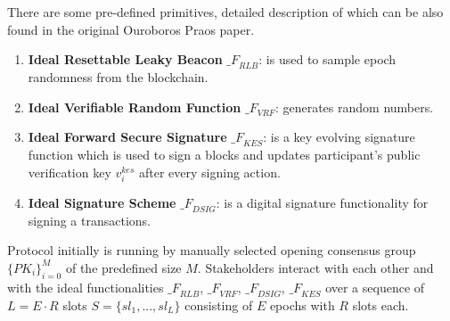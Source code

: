 There are some pre-defined primitives, detailed description of which can be also found in the original Ouroboros Praos paper.
\begin{enumerate}
    \item \textbf{Ideal Resettable Leaky Beacon} ${\mathcal_{F}}_{RLB}$: is used to sample epoch randomness from the blockchain.
    \item \textbf{Ideal Verifiable Random Function} ${\mathcal_{F}}_{VRF}$: generates random numbers.
    \item \textbf{Ideal Forward Secure Signature} ${\mathcal_{F}}_{KES}$: is a key evolving signature function which is used to sign a blocks and updates participant's public verification key $v_i^{kes}$ after every signing action.
    \item \textbf{Ideal Signature Scheme} ${\mathcal_{F}}_{DSIG}$: is a digital signature functionality for signing a transactions.
\end{enumerate}
Protocol initially is running by manually selected opening consensus group $\{PK_i\}_{i=0}^M$ of the predefined size $M$.
Stakeholders interact with each other and with the ideal functionalities ${\mathcal_{F}}_{RLB}$, ${\mathcal_{F}}_{VRF}$, ${\mathcal_{F}}_{DSIG}$, ${\mathcal_{F}}_{KES}$ over a sequence of $L = E \cdot R$ slots  ${S=\{sl_1,...,sl_L\}}$ consisting of $E$ epochs with $R$ slots each.
